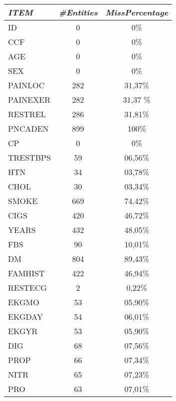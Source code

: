 \documentclass[a4paper,12pt]{article}
\begin{document}
    \begin{multicols}{2}
            \begin{tabular}{|l|c|c|} \hline

                \textit{ITEM}	& \textit{\#Entities}	& \textit{MissPercentage} \\
                \hline ID		&   0	&	0\% \\
                \hline CCF		&	0	&	0\% \\
                \hline AGE		&	0	&	0\% \\
                \hline SEX		&	0	&	0\% \\
                \hline PAINLOC	&	282	&	31,37\% \\
                \hline PAINEXER	&	282 & 	31,37 \% \\
                \hline RESTREL	&	286 &	31,81\% \\
                \hline PNCADEN	&	899 &	100\% \\
                \hline CP		&   0	&	0\% \\
                \hline TRESTBPS	&	59	&	06,56\% \\
                \hline HTN		& 	34	&	03,78\% \\
                \hline CHOL		& 	30	&	03,34\% \\
                \hline SMOKE	& 	669	&	74,42\% \\
                \hline CIGS		& 	420	&	46,72\% \\
                \hline YEARS	& 	432	&	48,05\% \\
                \hline FBS		& 	90	&	10,01\% \\
                \hline DM		& 	804	&	89,43\% \\
                \hline FAMHIST	&	422	& 	46,94\% \\
                \hline RESTECG	&	2	&	0,22\% \\
                \hline EKGMO	& 	53	&	05,90\% \\
                \hline EKGDAY	&	54	&	06,01\% \\
                \hline EKGYR	& 	53	&	05,90\% \\
                \hline DIG		& 	68	& 	07,56\% \\
                \hline PROP		& 	66	& 	07,34\% \\
                \hline NITR		& 	65	& 	07,23\% \\
                \hline PRO		&	63	& 	07,01\% \\ \hline



\end{tabular}
\end{multicols}
\end{document}
